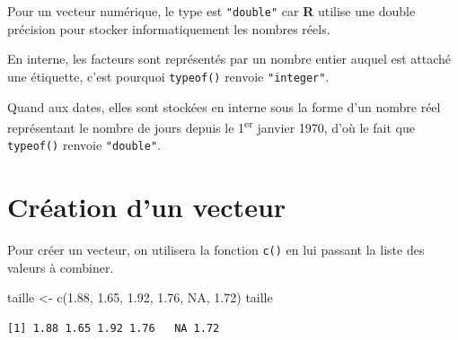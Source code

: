 \documentclass[
  letterpaper,
  DIV=11,
  numbers=noendperiod,
  oneside]{scrreprt}
\newenvironment{Shaded}{\begin{snugshade}}{\end{snugshade}}
\newcommand{\ConstantTok}[1]{\textcolor[rgb]{0.56,0.35,0.01}{#1}}
\newcommand{\FloatTok}[1]{\textcolor[rgb]{0.68,0.00,0.00}{#1}}
\newcommand{\FunctionTok}[1]{\textcolor[rgb]{0.28,0.35,0.67}{#1}}
\newcommand{\NormalTok}[1]{\textcolor[rgb]{0.00,0.23,0.31}{#1}}
\newcommand{\OtherTok}[1]{\textcolor[rgb]{0.00,0.23,0.31}{#1}}
\begin{document}
\begin{tcolorbox}[enhanced jigsaw, colbacktitle=quarto-callout-tip-color!10!white, opacityback=0, toprule=.15mm, colback=white, coltitle=black, bottomtitle=1mm, toptitle=1mm, titlerule=0mm, rightrule=.15mm, title=\textcolor{quarto-callout-tip-color}{\faLightbulb}\hspace{0.5em}{Astuce}, breakable, bottomrule=.15mm, opacitybacktitle=0.6, arc=.35mm, left=2mm, leftrule=.75mm, colframe=quarto-callout-tip-color-frame]

Pour un vecteur numérique, le type est \texttt{"double"} car \textbf{R}
utilise une double précision pour stocker informatiquement les nombres
réels.

En interne, les facteurs sont représentés par un nombre entier auquel
est attaché une étiquette, c'est pourquoi \texttt{typeof()} renvoie
\texttt{"integer"}.

Quand aux dates, elles sont stockées en interne sous la forme d'un
nombre réel représentant le nombre de jours depuis le
1\textsuperscript{er} janvier 1970, d'où le fait que \texttt{typeof()}
renvoie \texttt{"double"}.

\end{tcolorbox}

\hypertarget{cruxe9ation-dun-vecteur}{%
\section{Création d'un vecteur}\label{cruxe9ation-dun-vecteur}}

Pour créer un vecteur, on utilisera la fonction \texttt{c()} en lui
passant la liste des valeurs à combiner.

\begin{Shaded}
\begin{Highlighting}[]
\NormalTok{taille }\OtherTok{\textless{}{-}} \FunctionTok{c}\NormalTok{(}\FloatTok{1.88}\NormalTok{, }\FloatTok{1.65}\NormalTok{, }\FloatTok{1.92}\NormalTok{, }\FloatTok{1.76}\NormalTok{, }\ConstantTok{NA}\NormalTok{, }\FloatTok{1.72}\NormalTok{)}
\NormalTok{taille}
\end{Highlighting}
\end{Shaded}

\begin{verbatim}
[1] 1.88 1.65 1.92 1.76   NA 1.72
\end{verbatim}
\end{document}

